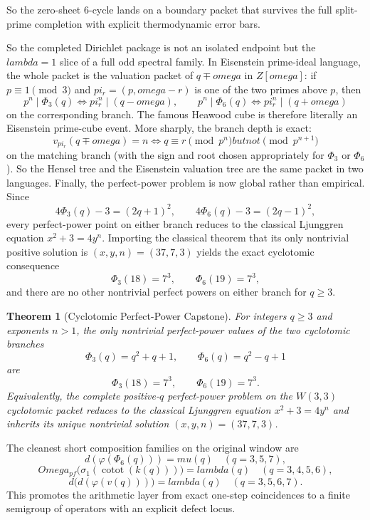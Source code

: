 \documentclass[12pt,a4paper]{article}
\def\mathbb#1{#1}%
\def\mathrm#1{#1}%
\def\text#1{#1}%
\def\omega{omega}%
\def\lambda{lambda}%
\def\mu{mu}%
\def\Phi#1{Phi#1}%
\def\pi{pi}%
\def\Omega{Omega}%
\newtheorem{theorem}{Theorem}[section]
\theoremstyle{definition}
\begin{document}
So the zero-sheet $6$-cycle lands on a boundary packet that survives the full split-prime completion with explicit thermodynamic error bars.

So the completed Dirichlet package is not an isolated endpoint but the $\lambda=1$ slice of a full odd spectral family.
In Eisenstein prime-ideal language, the whole packet is the valuation packet of $q\mp\omega$ in $\mathbb Z[\omega]$: if $p\equiv1\pmod3$ and $\pi_r=(p,\omega-r)$ is one of the two primes above $p$, then
\[
p^n\mid\Phi_3(q)\iff \pi_r^n\mid(q-\omega),
\qquad
p^n\mid\Phi_6(q)\iff \pi_r^n\mid(q+\omega)
\]
on the corresponding branch. The famous Heawood cube is therefore literally an Eisenstein prime-cube event.
More sharply, the branch depth is exact:
\[
v_{\pi_r}(q\mp\omega)=n
\iff
q\equiv r \pmod{p^n}
\text{ but not }\pmod{p^{n+1}}
\]
on the matching branch (with the sign and root chosen appropriately for $\Phi_3$ or $\Phi_6$). So the Hensel tree and the Eisenstein valuation tree are the same packet in two languages.
Finally, the perfect-power problem is now global rather than empirical. Since
\[
4\Phi_3(q)-3=(2q+1)^2, \qquad 4\Phi_6(q)-3=(2q-1)^2,
\]
every perfect-power point on either branch reduces to the classical Ljunggren equation $x^2+3=4y^n$. Importing the classical theorem that its only nontrivial positive solution is $(x,y,n)=(37,7,3)$ yields the exact cyclotomic consequence
\[
\Phi_3(18)=7^3, \qquad \Phi_6(19)=7^3,
\]
and there are no other nontrivial perfect powers on either branch for $q\ge3$.

\begin{theorem}[Cyclotomic Perfect-Power Capstone]
For integers $q\ge 3$ and exponents $n>1$, the only nontrivial perfect-power values of the two cyclotomic branches
\[
\Phi_3(q)=q^2+q+1,
\qquad
\Phi_6(q)=q^2-q+1
\]
are
\[
\Phi_3(18)=7^3,
\qquad
\Phi_6(19)=7^3.
\]
Equivalently, the complete positive-$q$ perfect-power problem on the $W(3,3)$ cyclotomic packet reduces to the classical Ljunggren equation $x^2+3=4y^n$ and inherits its unique nontrivial solution $(x,y,n)=(37,7,3)$.
\end{theorem}

The cleanest short composition families on the original window are
\[
d(\varphi(\Phi_6(q))) = \mu(q) \quad (q=3,5,7),
\]
\[
\Omega_{\mathrm{pf}}\!\bigl(\sigma_1(\operatorname{cotot}(k(q)))\bigr) = \lambda(q) \quad (q=3,4,5,6),
\]
\[
d\bigl(d(\varphi(v(q)))\bigr) = \lambda(q) \quad (q=3,5,6,7).
\]
This promotes the arithmetic layer from exact one-step coincidences to a finite semigroup of operators with an explicit defect locus.
\end{document}
